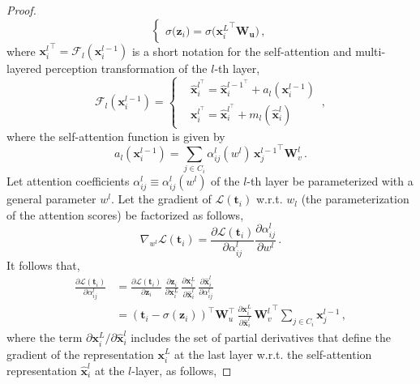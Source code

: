 \begin{proof}
\begin{equation}
\begin{cases}
\sigma\big(\bm{z}_i\big)  = \sigma\big({\bm{x}_i^L}^\top \bm{W_u}\big)\,,
%
\end{cases}
\label{eq-proof-gradient-bilinear-form-transformer-model}
\end{equation}
%
where ${\bm{x}^l_i}^\top = \mathcal{F}_l(\bm{x}_i^{l-1})$ is a short notation for the self-attention and multi-layered perception transformation of the $l$-th layer,
%
\begin{equation}
\mathcal{F}_l(\bm{x}_i^{l-1}) =
\left\{
\begin{aligned}
& \hat{\bm{x}}_i^{l^{\top}} = \hat{\bm{x}}_i^{{l-1}^{\top}} + a_l(\bm{x}_i^{l-1}) \\
& \bm{x}_i^{l^{\top}} = \hat{\bm{x}}_i^{l^{\top}} + m_l(\hat{\bm{x}}^l_i)
\end{aligned}
\right.\,,
\end{equation}
%
where the self-attention function is given by
%
\begin{equation}
    a_l(\bm{x}_i^{l-1}) = \sum_{j\in C_i} 
\alpha^l_{ij}(w^l)\,
{\bm{x}^{l-1}_j}^\top \bm{W}^l_v \,.
\end{equation}
%
Let attention coefficients $\alpha^l_{ij} \equiv \alpha^l_{ij} (w^l)$ of the $l$-th layer be parameterized with a general parameter $w^l$.
%
%
Let the gradient of $\mathcal{L}(\bm{t}_i)$ w.r.t. $w_l$ (the parameterization of the attention scores) be factorized as follows,
%
\begin{equation}
    \nabla_{w^l} \mathcal{L}(\bm{t}_i) = \frac{\partial \mathcal{L}(\bm{t}_i)}{\partial \alpha^l_{ij}} \frac{\partial \alpha^l_{ij}}{\partial w^l}\,.
\end{equation}
%
It follows that,
%
\begin{equation}
\begin{split}
    \frac{\partial \mathcal{L}(\bm{t}_i)}{\partial \alpha^l_{ij}} 
    & = \frac{\partial \mathcal{L}(\bm{t}_i)}{\partial \bm{z}_i} \, \frac{\partial \bm{z}_i}{\partial \bm{x}^L_i} \, \frac{\partial \bm{x}^L_i}{\partial \hat{\bm{x}}^l_i}\,\frac{\partial \hat{\bm{x}}^l_i} {\partial \alpha^l_{ij}} 
    \\
    & = (\bm{t}_i - \sigma(\bm{z}_i))^\top \bm{W}_u^\top \, \frac{\partial \bm{x}^L_i}{\partial \hat{\bm{x}}^l_i}\,{\bm{W}^l_v}^\top \sum_{j\in C_i} \bm{x}^{l-1}_j \,,
\end{split}
\end{equation}
%
where the term $\partial \bm{x}_i^L / \partial \hat{\bm{x}}_i^l$ includes the set of partial derivatives that define the gradient of the representation $\bm{x}_i^L $ at the last layer w.r.t. the self-attention representation $\hat{\bm{x}}_i^l$ at the $l$-layer, as follows,

\end{proof}
